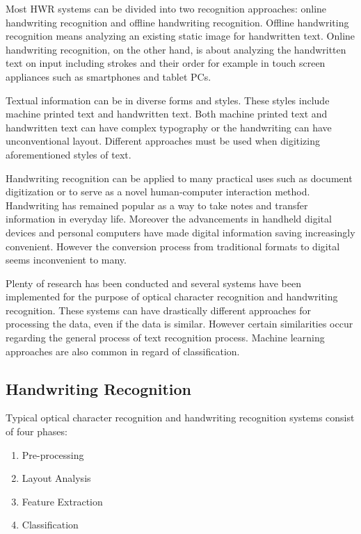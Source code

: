 \documentclass{article}
\begin{document}
    Most HWR systems can be divided into two recognition approaches: online handwriting recognition and offline handwriting recognition. Offline handwriting recognition means analyzing an existing static image for handwritten text. Online handwriting recognition, on the other hand, is about analyzing the handwritten text on input including strokes and their order for example in touch screen appliances such as smartphones and tablet PCs.

    Textual information can be in diverse forms and styles. These styles include machine printed text and handwritten text. Both machine printed text and handwritten text can have complex typography or the handwriting can have unconventional layout. Different approaches must be used when digitizing aforementioned styles of text.

    Handwriting recognition can be applied to many practical uses such as document digitization or to serve as a novel human-computer interaction method. Handwriting has remained popular as a way to take notes and transfer information in everyday life. Moreover the advancements in handheld digital devices and personal computers have made digital information saving increasingly convenient. However the conversion process from traditional formats to digital seems inconvenient to many.

    Plenty of research has been conducted and several systems have been implemented for the purpose of optical character recognition and handwriting recognition. These systems can have drastically different approaches for processing the data, even if the data is similar. However certain similarities occur regarding the general process of text recognition process. Machine learning approaches are also common in regard of classification.


  \subsection{Handwriting Recognition}
    Typical optical character recognition and handwriting recognition systems consist of four phases:

    \begin{enumerate}
      \item{Pre-processing}
      \item{Layout Analysis}
      \item{Feature Extraction}
      \item{Classification}
    \end{enumerate}
\end{document}
